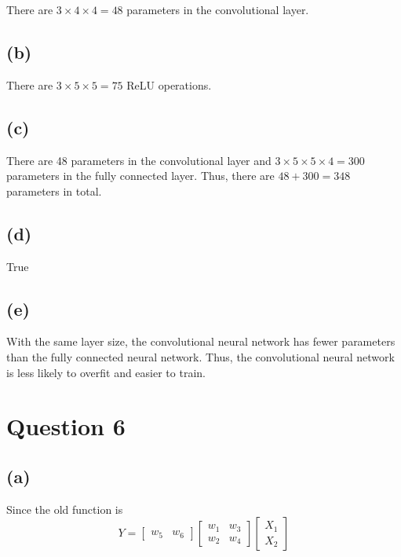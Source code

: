\documentclass[a4paper,12pt]{article}
\begin{document}
There are $3 \times 4 \times 4 = 48$ parameters in the convolutional layer.

\subsection*{(b)}

There are $3 \times 5 \times 5 = 75$ ReLU operations.

\subsection*{(c)}

There are 48 parameters in the convolutional layer and $3 \times 5 \times 5 \times 4 = 300$ parameters in the fully connected layer. Thus, there are $48 + 300 = 348$ parameters in total.

\subsection*{(d)}

True

\subsection*{(e)}

With the same layer size, the convolutional neural network has fewer parameters than the fully connected neural network. Thus, the convolutional neural network is less likely to overfit and easier to train.

\section*{Question 6}

\subsection*{(a)}

Since the old function is
\begin{equation*}
	Y = 
	\begin{bmatrix}
		w_5 & w_6
	\end{bmatrix}
	\begin{bmatrix}
		w_1 & w_3 \\
		w_2 & w_4
	\end{bmatrix}
	\begin{bmatrix}
		X_1 \\
		X_2
	\end{bmatrix}
\end{equation*}
\end{document}
